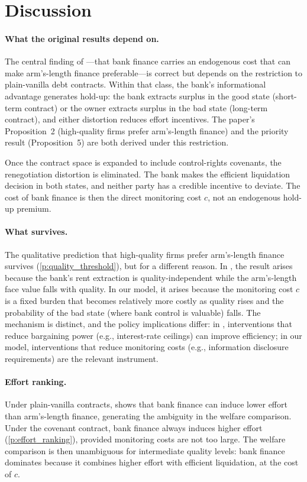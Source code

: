 \documentclass[12pt,a4paper]{article}
\theoremstyle{plain}
\theoremstyle{definition}
\theoremstyle{remark}
\begin{document}
\section{Discussion}
\label{sec:discussion}

\paragraph{What the original results depend on.}
The central finding of \citet{Rajan1992}---that bank finance carries an endogenous
cost that can make arm's-length finance preferable---is correct but depends on the
restriction to plain-vanilla debt contracts. Within that class, the bank's
informational advantage generates hold-up: the bank extracts surplus in the good state
(short-term contract) or the owner extracts surplus in the bad state (long-term
contract), and either distortion reduces effort incentives. The paper's Proposition~2
(high-quality firms prefer arm's-length finance) and the priority result
(Proposition~5) are both derived under this restriction.

Once the contract space is expanded to include control-rights covenants, the
renegotiation distortion is eliminated. The bank makes the efficient liquidation
decision in both states, and neither party has a credible incentive to deviate. The
cost of bank finance is then the direct monitoring cost $c$, not an endogenous
hold-up premium.

\paragraph{What survives.}
The qualitative prediction that high-quality firms prefer arm's-length finance survives
(\cref{p:quality_threshold}), but for a different reason. In \citet{Rajan1992}, the
result arises because the bank's rent extraction is quality-independent while the
arm's-length face value falls with quality. In our model, it arises because the
monitoring cost $c$ is a fixed burden that becomes relatively more costly as quality
rises and the probability of the bad state (where bank control is valuable) falls.
The mechanism is distinct, and the policy implications differ: in \citet{Rajan1992},
interventions that reduce bargaining power (e.g., interest-rate ceilings) can improve
efficiency; in our model, interventions that reduce monitoring costs (e.g., information
disclosure requirements) are the relevant instrument.

\paragraph{Effort ranking.}
Under plain-vanilla contracts, \citet{Rajan1992} shows that bank finance can induce
lower effort than arm's-length finance, generating the ambiguity in the welfare
comparison. Under the covenant contract, bank finance always induces higher effort
(\cref{p:effort_ranking}), provided monitoring costs are not too large. The welfare
comparison is then unambiguous for intermediate quality levels: bank finance dominates
because it combines higher effort with efficient liquidation, at the cost of $c$.
\end{document}
